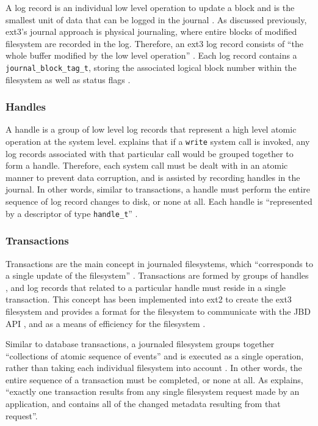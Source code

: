 A log record is an individual low level operation to update a block and is the smallest unit of data that can be logged in the journal \citep{Mauerer2008}. As discussed previously, ext3's journal approach is physical journaling, where entire blocks of modified filesystem are recorded in the log. Therefore, an ext3 log record consists of ``the whole buffer modified by the low level operation'' \citep[p. 770]{Bovet2006}. Each log record contains a \texttt{journal_block_tag_t}, storing the associated logical block number within the filesystem as well as status flags \citep{Bovet2006}.

\subsubsection{Handles}

A handle is a group of low level log records that represent a high level atomic operation at the system level. \citet[p. 639]{Mauerer2008} explains that if a \texttt{write} system call is invoked, any log records associated with that particular call would be grouped together to form a handle. Therefore, each system call must be dealt with in an atomic manner to prevent data corruption, and is assisted by recording handles in the journal. In other words, similar to transactions, a handle must perform the entire sequence of log record changes to disk, or none at all. Each handle is ``represented by a descriptor of type \texttt{handle_t}'' \citep[p. 770]{Bovet2006}.

\subsubsection{Transactions}

Transactions are the main concept in journaled filesystems, which ``corresponds to a single update of the filesystem'' \citep[p. 4]{Tweedie1998}. Transactions are formed by groups of handles \citep{Mauerer2008, Bovet2006}, and log records that related to a particular handle must reside in a single transaction. This concept has been implemented into ext2 to create the ext3 filesystem and provides a format for the filesystem to communicate with the JBD API \citep{Tweedie2000}, and as a means of efficiency for the filesystem \citep{Bovet2006}.

Similar to database transactions, a journaled filesystem groups together ``collections of atomic sequence of events'' and is executed as a single operation, rather than taking each individual filesystem into account \citep[p. 2]{Katiyar2011}. In other words, the entire sequence of a transaction must be completed, or none at all. As \citet[p. 4]{Tweedie2000} explains, ``exactly one transaction results from any single filesystem request made by an application, and contains all of the changed metadata resulting from that request''.

